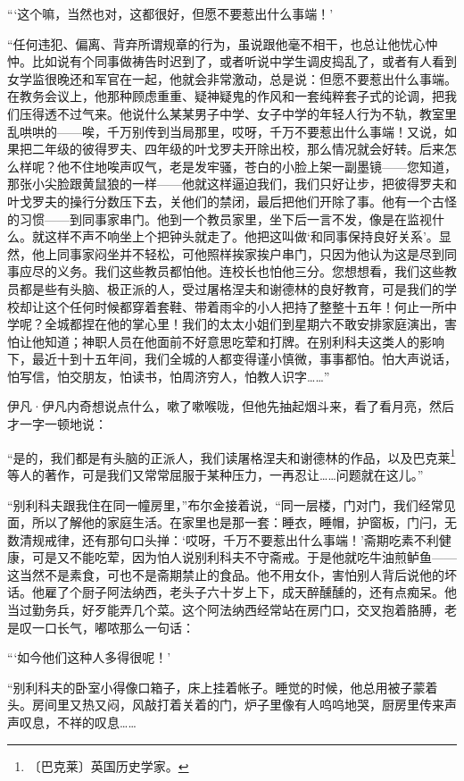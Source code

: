 \documentclass[12pt,UTF-8,openany]{ctexbook}
\begin{document}
\begin{normalsize}
    “‘这个嘛，当然也对，这都很好，但愿不要惹出什么事端！’
    
    “任何违犯、偏离、背弃所谓规章的行为，虽说跟他毫不相干，也总让他忧心忡忡。比如说有个同事做祷告时迟到了，或者听说中学生调皮捣乱了，或者有人看到女学监很晚还和军官在一起，他就会非常激动，总是说：但愿不要惹出什么事端。在教务会议上，他那种顾虑重重、疑神疑鬼的作风和一套纯粹套子式的论调，把我们压得透不过气来。他说什么某某男子中学、女子中学的年轻人行为不轨，教室里乱哄哄的——唉，千万别传到当局那里，哎呀，千万不要惹出什么事端！又说，如果把二年级的彼得罗夫、四年级的叶戈罗夫开除出校，那么情况就会好转。后来怎么样呢？他不住地唉声叹气，老是发牢骚，苍白的小脸上架一副墨镜——您知道，那张小尖脸跟黄鼠狼的一样——他就这样逼迫我们，我们只好让步，把彼得罗夫和叶戈罗夫的操行分数压下去，关他们的禁闭，最后把他们开除了事。他有一个古怪的习惯——到同事家串门。他到一个教员家里，坐下后一言不发，像是在监视什么。就这样不声不响坐上个把钟头就走了。他把这叫做‘和同事保持良好关系’。显然，他上同事家闷坐并不轻松，可他照样挨家挨户串门，只因为他认为这是尽到同事应尽的义务。我们这些教员都怕他。连校长也怕他三分。您想想看，我们这些教员都是些有头脑、极正派的人，受过屠格涅夫和谢德林的良好教育，可是我们的学校却让这个任何时候都穿着套鞋、带着雨伞的小人把持了整整十五年！何止一所中学呢？全城都捏在他的掌心里！我们的太太小姐们到星期六不敢安排家庭演出，害怕让他知道；神职人员在他面前不好意思吃荤和打牌。在别利科夫这类人的影响下，最近十到十五年间，我们全城的人都变得谨小慎微，事事都怕。怕大声说话，怕写信，怕交朋友，怕读书，怕周济穷人，怕教人识字……”
    
    伊凡·伊凡内奇想说点什么，嗽了嗽喉咙，但他先抽起烟斗来，看了看月亮，然后才一字一顿地说：
    
    “是的，我们都是有头脑的正派人，我们读屠格涅夫和谢德林的作品，以及巴克莱\footnote{〔巴克莱〕英国历史学家。}等人的著作，可是我们又常常屈服于某种压力，一再忍让……问题就在这儿。”
    
    “别利科夫跟我住在同一幢房里，”布尔金接着说，“同一层楼，门对门，我们经常见面，所以了解他的家庭生活。在家里也是那一套：睡衣，睡帽，护窗板，门闩，无数清规戒律，还有那句口头掸：‘哎呀，千万不要惹出什么事端！’斋期吃素不利健康，可是又不能吃荤，因为怕人说别利科夫不守斋戒。于是他就吃牛油煎鲈鱼——这当然不是素食，可也不是斋期禁止的食品。他不用女仆，害怕别人背后说他的坏话。他雇了个厨子阿法纳西，老头子六十岁上下，成天醉醺醺的，还有点痴呆。他当过勤务兵，好歹能弄几个菜。这个阿法纳西经常站在房门口，交叉抱着胳膊，老是叹一口长气，嘟哝那么一句话：
    
    “‘如今他们这种人多得很呢！’
    
    “别利科夫的卧室小得像口箱子，床上挂着帐子。睡觉的时候，他总用被子蒙着头。房间里又热又闷，风敲打着关着的门，炉子里像有人呜呜地哭，厨房里传来声声叹息，不祥的叹息……
    

\end{normalsize}
\end{document}
